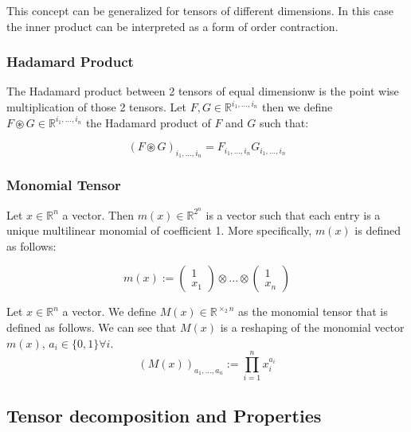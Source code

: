 \documentclass{article}
\begin{document}
This concept can be generalized for tensors of different dimensions. 
In this case the inner product can be interpreted as a form of order contraction.

\subsubsection*{Hadamard Product}

The Hadamard product between 2 tensors of equal dimensionw is the 
point wise multiplication of those 2 tensors. 
Let $F,G \in \mathbb{R}^{i_1,...,i_n}$ then we define $F\circledast G \in \mathbb{R}^{i_1,...,i_n}$
the Hadamard product of $F$ and $G$ such that:

\begin{equation}
    (F\circledast G )_{i_1,...,i_n} = F_{i_1,...,i_n}G_{i_1,...,i_n}
\end{equation}

\subsubsection*{Monomial Tensor}

Let $x \in \mathbb{R}^n$ a vector. Then $m(x) \in \mathbb{R}^{2^n}$ is a vector 
such that each entry is a unique multilinear monomial of coefficient 1.
More specifically, $m(x)$ is defined as follows:

\begin{equation}
    m(x) := \begin{pmatrix}
        1 \\
        x_1
    \end{pmatrix}
    \otimes ... \otimes
    \begin{pmatrix}
        1 \\
        x_n
    \end{pmatrix}
\end{equation}

Let $x \in \mathbb{R}^n$ a vector. We define $M(x) \in \mathbb{R}^{\times_2 n}$ as the monomial 
tensor that is defined as follows. We can see that $M(x)$ is a reshaping of the monomial vector
$m(x)$, $a_i \in \{0,1\} \forall i$.
\begin{equation}
    (M(x))_{a_1, ..., a_n} := \prod_{i=1}^{n} x_i^{a_i}
\end{equation}

\subsection{Tensor decomposition and Properties}
\end{document}
